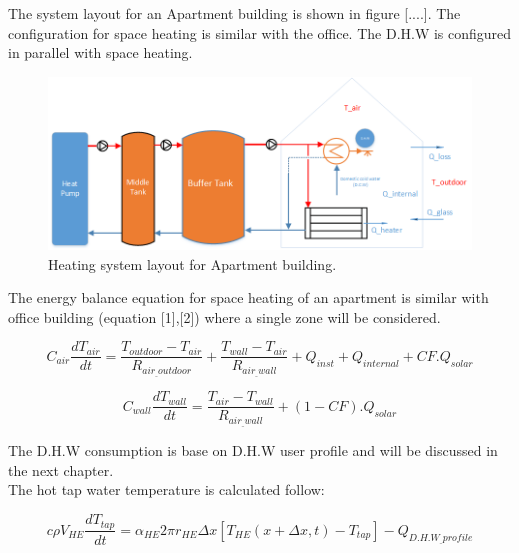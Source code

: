 \documentclass[a4paper,10pt]{article}
\begin{document}
The system layout for an Apartment building is shown in figure [....]. The configuration for space heating is similar with the office. The D.H.W is configured in parallel with space heating.

\begin{figure}[H]
\centering
\includegraphics[width=1\columnwidth]{pictures/Apartment_diagram.png}
\caption[Short title]{Heating system layout for Apartment building.}
\label{fig:ff6}\end{figure}


The energy balance equation for space heating of an apartment is similar with office building (equation [1],[2]) where a single zone will be considered.

\[C_{air}\frac{dT_{air}}{dt}=\frac{T_{outdoor}-T_{air}}{R_{air_{\_}outdoor}} + \frac{T_{wall}-T_{air}}{R_{air_{\_}wall}} + Q_{inst} + Q_{internal} + CF.Q_{solar}\]

\[C_{wall}\frac{dT_{wall}}{dt}=\frac{T_{air}-T_{wall}}{R_{air_{\_}wall}} + (1-CF).Q_{solar}\]

The D.H.W consumption is base on D.H.W user profile and will be discussed in the next chapter.\\
The hot tap water temperature is calculated follow:


\begin{equation}
    c\rho V_{HE}\frac{dT_{tap}}{dt}= \alpha_{HE}2\pi r_{HE}\Delta x[T_{HE}(x+\Delta x,t)- T_{tap}] - Q_{D.H.W_{\_}profile}
\end{equation}

\end{document}
